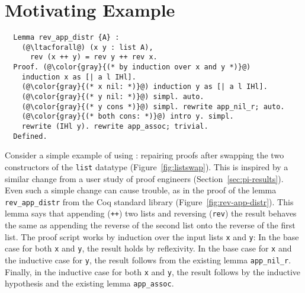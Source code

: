 \section{Motivating Example}
\label{sec:overview}

\begin{figure*}
\begin{minipage}{0.50\textwidth}
   
\end{minipage}
\hfill
\begin{minipage}{0.49\textwidth}
   
\end{minipage}
\caption{A change from the old version (left) to the new version (right) of \lstinline{list}.
Recall that \lstinline{list} is an inductive datatype that is either empty (the \lstinline{nil} constructor), or the result
of placing an element in front of another \lstinline{list} (the \lstinline{cons} constructor). The change swaps these
constructors ().}
\label{fig:listswap}
\end{figure*}

\begin{figure*}
\begin{lstlisting}
  Lemma rev_app_distr {A} :
    (@\ltacforall@) (x y : list A),
      rev (x ++ y) = rev y ++ rev x.
  Proof. (@\color{gray}{(* by induction over x and y *)}@)
    induction x as [| a l IHl].
    (@\color{gray}{(* x nil: *)}@) induction y as [| a l IHl].
    (@\color{gray}{(* y nil: *)}@) simpl. auto.
    (@\color{gray}{(* y cons *)}@) simpl. rewrite app_nil_r; auto.
    (@\color{gray}{(* both cons: *)}@) intro y. simpl.
    rewrite (IHl y). rewrite app_assoc; trivial.
  Defined.
\end{lstlisting}
\caption{The proof of the lemma \lstinline{rev_app_distr} from the Coq standard library. Comments mine for clarity.}
\label{fig:rev-app-distr}
\end{figure*}

Consider a simple example of using \toolnamec: repairing proofs after swapping the two constructors of the \lstinline{list} datatype (Figure~\ref{fig:listswap}).
This is inspired by a similar change from a user study of proof engineers (Section~\ref{sec:pi-results}).
Even such a simple change can cause trouble, as in the proof of the lemma \lstinline{rev_app_distr} from the
Coq standard library (Figure~\ref{fig:rev-app-distr}).
This lemma says that appending (\lstinline{++}) two lists and reversing (\lstinline{rev}) the result behaves the same as appending
the reverse of the second list onto the reverse of the first list.
The proof script works by induction over the input lists \lstinline{x} and \lstinline{y}:
In the base case for both \lstinline{x} and \lstinline{y}, the result holds by reflexivity.
In the base case for \lstinline{x} and the inductive case for \lstinline{y}, the result follows from the existing lemma \lstinline{app_nil_r}.
Finally, in the inductive case for both \lstinline{x} and \lstinline{y}, the result follows by the inductive hypothesis
and the existing lemma \lstinline{app_assoc}.

